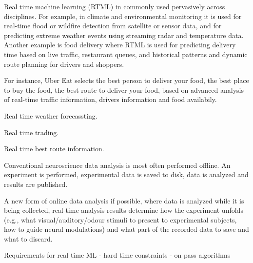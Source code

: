 

Real time machine learning (RTML) in commonly used pervasively across
disciplines.
%
For example, in climate and environmental monitoring it is used for real-time
flood or wildfire detection from satellite or sensor data, and for predicting
extreme weather events using streaming radar and temperature data.
%
Another example is food delivery where RTML is used for predicting delivery
time based on live traffic, restaurant queues, and historical patterns and
dynamic route planning for drivers and shoppers.

For instance, Uber Eat selects the
best person to deliver your food, the best place to buy the food, the best
route to deliver your food, based on advanced analysis of real-time traffic
information, drivers information and food availabily.

Real time weather forecassting.

Real time trading.

Real time best route information.


Conventional neuroscience data analysis is most often performed offline. An
experiment is performed, experimental data is saved to disk, data is analyzed
and results are published.

A new form of online data analysis if possible, where data is analyzed while it
is being collected, real-time analysis results determine how the experiment
unfolds (e.g., what visual/auditory/odour stimuli to present to experimental
subjects, how to guide neural modulations) and what part of the recorded data
to save and what to discard.




Requirements for real time ML
- hard time constraints
- on pass algorithms

%
